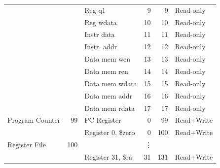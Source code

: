 \documentclass{article}
\begin{document}
\begin{table}[]
\begin{tabular}{|l|r|l|r|r|l|}
                                    &                        & Reg q1               & 9                     & 9                   & Read-only           \\ \cline{3-6} 
                                    &                        & Reg wdata            & 10                    & 10                  & Read-only           \\ \cline{3-6} 
                                    &                        & Instr data           & 11                    & 11                  & Read-only           \\ \cline{3-6} 
                                    &                        & Instr. addr          & 12                    & 12                  & Read-only           \\ \cline{3-6} 
                                    &                        & Data mem wen         & 13                    & 13                  & Read-only           \\ \cline{3-6} 
                                    &                        & Data mem ren         & 14                    & 14                  & Read-only           \\ \cline{3-6} 
                                    &                        & Data mem wdata       & 15                    & 15                  & Read-only           \\ \cline{3-6} 
                                    &                        & Data mem addr        & 16                    & 16                  & Read-only           \\ \cline{3-6} 
                                    &                        & Data mem rdata       & 17                    & 17                  & Read-only           \\ \hline
Program Counter                     & 99                     & PC Register          & 0                     & 99                  & Read+Write          \\ \hline
\multirow{3}{*}{Register File}      & \multirow{3}{*}{100}   & Register 0, \$zero   & 0                     & 100                 & Read+Write          \\ \cline{3-6} 
                                    &                        & \multicolumn{4}{c|}{\vdots}                                                              \\ \cline{3-6} 
                                    &                        & Register 31, \$ra    & 31                    & 131                 & Read+Write          \\ \hline

\end{tabular}
\end{table}
\end{document}

